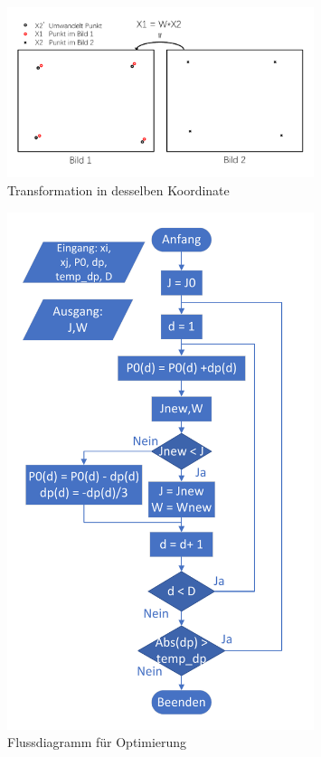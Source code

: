\begin{figure}[H]
 \centering 
 \includegraphics[keepaspectratio,width=0.8\textwidth]{images/4_ZweiteErfahrung/Kamera/Transformmatrix.pdf}
 \caption{Transformation in desselben Koordinate}
 \label{fig:Transformation in eine Koordinate}
\end{figure} 

\begin{figure}[H]
 \centering 
 \includegraphics[keepaspectratio,width=0.8\textwidth]{images/4_ZweiteErfahrung/Kamera/flussdiagramm_for_parameter.pdf}
 \caption{Flussdiagramm für Optimierung}
 \label{fig:FlussdiagrammforOptimierung}
\end{figure} 



